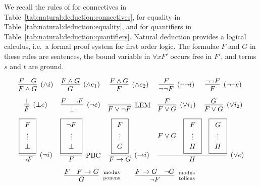 
\begin{definition}\label{def:natural:deduction}
	We recall the rules of  for connectives
	in Table~\ref{tab:natural:deduction:connectives},
	for equality in Table~\ref{tab:natural:deduction:equality},
	and for quantifiers in Table~\ref{tab:natural:deduction:quantifiers}.
	Natural deduction provides a logical calculus,
	i.e.~a formal proof system for first order logic.
	The formulae \( F \) and \( G \) in these rules are sentences,
	the bound variable in  \( \forall x F' \) occurs free in \( F' \),
	and terms \( s \) and \( t \) are ground.

\begin{table}[hbt]
\begin{gather*}
\begin{array}{ccccc}
\infer[(\land i)]{F\land G}{F & G}
&
\infer[(\land e_1)]{G}{F \land G}
&
\infer[(\land e_2)]{F}{F \land G}
&
\infer[(\lnot\lnot i)]{\lnot\lnot F}{F}
&
\infer[(\lnot\lnot e)]{F}{\lnot\lnot F}
\\[0.7em]
\infer[(\bot e)]{F}{\bot}
&
\infer[(\lnot e)]{\bot}{F & \lnot F}
&
\infer[\text{LEM}]{F\lor\lnot F}{}
&
\infer[(\lor i_1)]{F\lor G}{F}
&
\infer[(\lor i_2)]{F\lor G}{G}
\\[0.7em]
\infer[(\lnot i)]{\lnot F}{
	\boxed{\begin{array}{c}F \\ \vdots \\ \bot \end{array}}}
&
\infer[\text{PBC}]{F}{
	\boxed{\begin{array}{c}\lnot F \\ \vdots \\ \bot \end{array}}}
&
\infer[({\limp} i)]{F\limp G}{
	\boxed{\begin{array}{c}F \\ \vdots \\ G \end{array}
}}
&
\multicolumn{2}{l}{
	\infer[(\lor e)]{H}{
		F\lor G &
		\boxed{\begin{array}{c}F \\ \vdots \\ H \end{array}} &
		\boxed{\begin{array}{c}G \\ \vdots \\ H \end{array}}
	}
}
\\[0.7em]
&
\multicolumn{3}{r}{
\infer[\text{modus}\atop\text{ponens}]{G}{F & F\limp G}
\qquad
\infer[\text{modus}\atop\text{tollens}]{\lnot F}{F\limp G & \lnot G}
}
&
\end{array}
\end{gather*}
\caption{Natural Deduction Rules for Connectives}\label{tab:natural:deduction:connectives}
\end{table}


\end{definition}

